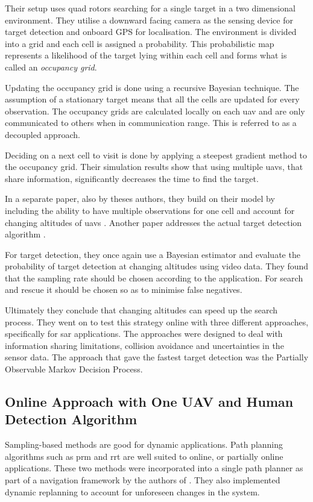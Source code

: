 Their setup uses quad rotors searching for a single target in a two dimensional environment. They utilise a downward facing camera as the sensing device for target detection and onboard GPS for localisation. The environment is divided into a grid and each cell is assigned a probability. This probabilistic map represents a likelihood of the target lying within each cell and forms what is called an \emph{occupancy grid}.

Updating the occupancy grid is done using a recursive Bayesian technique. The assumption of a stationary target means that all the cells are updated for every observation. The occupancy grids are calculated locally on each \ac{uav} and are only communicated to others when in communication range. This is referred to as a decoupled approach. 

Deciding on a next cell to visit is done by applying a steepest gradient method to the occupancy grid. Their simulation results show that using multiple \acp{uav}, that share information, significantly decreases the time to find the target.

In a separate paper, also by theses authors, they build on their model by including the ability to have multiple observations for one cell and account for changing altitudes of \acp{uav} \cite{Waharte2010}. Another paper addresses the actual target detection algorithm \cite{Symington2010}.

For target detection, they once again use a Bayesian estimator and evaluate the probability of target detection at changing altitudes using video data. They found that the sampling rate should be chosen according to the application. For search and rescue it should be chosen so as to minimise false negatives.

Ultimately they conclude that changing altitudes can speed up the search process. They went on to test this strategy online with three different approaches, specifically for \acl{sar} applications. The approaches were designed to deal with information sharing limitations, collision avoidance and uncertainties in the sensor data. The approach that gave the fastest target detection was the Partially Observable Markov Decision Process. \cite{WaharteFINAL2010} 

\subsection{Online Approach with One UAV and Human Detection Algorithm}
\label{sec:LR SAR-Sampling}
Sampling-based methods are good for dynamic applications. Path planning algorithms such as \ac{prm} and \ac{rrt} are well suited to online, or partially online applications. These two methods were incorporated into a single path planner as part of a navigation framework by the authors of \cite{Wzorek2006}. They also implemented dynamic replanning to account for unforeseen changes in the system. 

